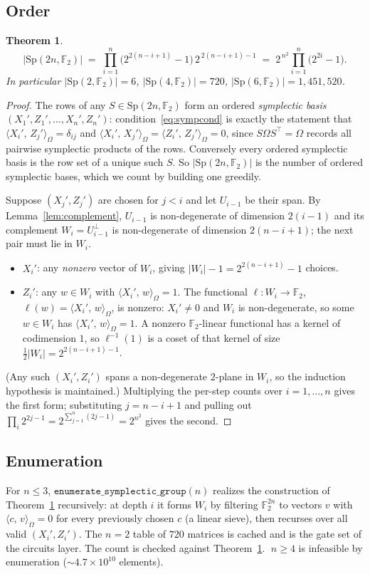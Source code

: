 \documentclass[11pt]{article}
\theoremstyle{definition}
\theoremstyle{plain}
\newtheorem{theorem}[definition]{Theorem}
\newcommand{\F}{\mathbb{F}}
\newcommand{\Sp}{\mathrm{Sp}}
\newcommand{\sympprod}[2]{\langle #1,\, #2\rangle_{\Omega}}
\newcommand{\half}{\tfrac12}
\begin{document}
\subsection{Order}
\begin{theorem}
\label{thm:order}
\[
  |\Sp(2n,\F_2)|
  \;=\; \prod_{i=1}^{n}\bigl(2^{2(n-i+1)}-1\bigr)\,2^{\,2(n-i+1)-1}
  \;=\; 2^{\,n^2}\prod_{i=1}^{n}\bigl(2^{2i}-1\bigr).
\]
In particular $|\Sp(2,\F_2)|=6$, $|\Sp(4,\F_2)|=720$,
$|\Sp(6,\F_2)|=1{,}451{,}520$.
\end{theorem}
\begin{proof}
The rows of any $S\in\Sp(2n,\F_2)$ form an ordered \emph{symplectic basis}
$(X_1',Z_1',\dots,X_n',Z_n')$: condition~\eqref{eq:sympcond} is exactly the
statement that $\sympprod{X_i'}{Z_j'}=\delta_{ij}$ and
$\sympprod{X_i'}{X_j'}=\sympprod{Z_i'}{Z_j'}=0$, since
$S\Omega S^{\!\top}=\Omega$ records all pairwise symplectic products of the rows.
Conversely every ordered symplectic basis is the row set of a unique such $S$.
So $|\Sp(2n,\F_2)|$ is the number of ordered symplectic bases, which we count by
building one greedily.

Suppose $(X_j',Z_j')$ are chosen for $j<i$ and let $U_{i-1}$ be their span. By
Lemma~\ref{lem:complement}, $U_{i-1}$ is non-degenerate of dimension $2(i-1)$ and
its complement $W_i=U_{i-1}^{\perp}$ is non-degenerate of dimension
$2(n-i+1)$; the next pair must lie in $W_i$.
\begin{itemize}[leftmargin=1.5em]
\item $X_i'$: any \emph{nonzero} vector of $W_i$, giving $|W_i|-1=2^{2(n-i+1)}-1$
  choices.
\item $Z_i'$: any $w\in W_i$ with $\sympprod{X_i'}{w}=1$. The functional
  $\ell:W_i\to\F_2$, $\ell(w)=\sympprod{X_i'}{w}$, is nonzero: $X_i'\ne0$ and
  $W_i$ is non-degenerate, so some $w\in W_i$ has $\sympprod{X_i'}{w}=1$. A
  nonzero $\F_2$-linear functional has a kernel of codimension $1$, so
  $\ell^{-1}(1)$ is a coset of that kernel of size
  $\half|W_i|=2^{2(n-i+1)-1}$.
\end{itemize}
(Any such $(X_i',Z_i')$ spans a non-degenerate $2$-plane in $W_i$, so the
induction hypothesis is maintained.) Multiplying the per-step counts over
$i=1,\dots,n$ gives the first form; substituting $j=n-i+1$ and pulling out
$\prod_i 2^{2j-1}=2^{\sum_{j=1}^n(2j-1)}=2^{n^2}$ gives the second.
\end{proof}

\subsection{Enumeration}
For $n\le 3$, $\texttt{enumerate\_symplectic\_group}(n)$ realizes the
construction of Theorem~\ref{thm:order} recursively: at depth $i$ it forms
$W_i$ by filtering $\F_2^{2n}$ to vectors $v$ with $\sympprod{c}{v}=0$ for every
previously chosen $c$ (a linear sieve), then recurses over all valid
$(X_i',Z_i')$. The $n=2$ table of $720$ matrices is cached and is the gate set
of the circuits layer. The count is checked against Theorem~\ref{thm:order}.
$\;n\ge 4$ is infeasible by enumeration ($\sim 4.7\times 10^{10}$ elements).
\end{document}
